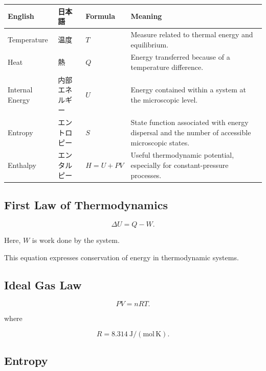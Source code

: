 \documentclass[11pt,a4paper]{article}
\begin{document}
\begin{longtable}{p{} p{} p{} p{}}
\toprule
\textbf{English} & \textbf{日本語} & \textbf{Formula} & \textbf{Meaning} \\
\midrule
\endhead

Temperature & 温度 &
$T$ &
Measure related to thermal energy and equilibrium. \\

Heat & 熱 &
$Q$ &
Energy transferred because of a temperature difference. \\

Internal Energy & 内部エネルギー &
$U$ &
Energy contained within a system at the microscopic level. \\

Entropy & エントロピー &
$S$ &
State function associated with energy dispersal and the number of accessible microscopic states. \\

Enthalpy & エンタルピー &
$H=U+PV$ &
Useful thermodynamic potential, especially for constant-pressure processes. \\

\bottomrule
\end{longtable}

\subsection{First Law of Thermodynamics}

\[
\Delta U=Q-W.
\]

Here, $W$ is work done by the system.

This equation expresses conservation of energy in thermodynamic systems.

\subsection{Ideal Gas Law}

\[
PV=nRT.
\]

where

\[
R=8.314\ \mathrm{J/(mol\,K)}.
\]

\subsection{Entropy}
\end{document}
